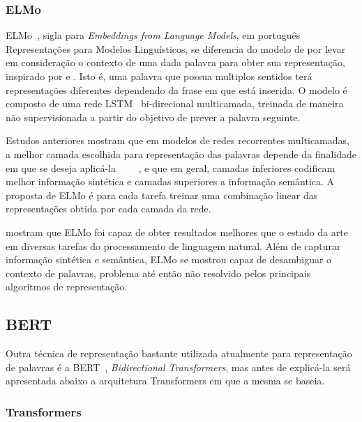 \subsubsection{ELMo}

ELMo~\cite{peters18}, sigla para \textit{Embeddings from Language Models}, em
português Representações para Modelos Linguísticos, se diferencia do modelo de
\citet{cho14} por levar em consideração o contexto de uma dada palavra para
obter sua representação, inspirado por \citet{peters17} e \citet{mccann17}.
Isto é, uma palavra que possua multiplos sentidos terá representações diferentes
dependendo da frase em que está inserida.
O modelo é composto de uma rede LSTM~\cite{hochreiter97} bi-direcional
multicamada, treinada de maneira não supervisionada a partir do objetivo de
prever a palavra seguinte.

Estudos anteriores mostram que em modelos de redes recorrentes multicamadas,
a melhor camada escolhida para representação das palavras depende da finalidade
em que se deseja aplicá-la
~\cite{hashimoto16}~\cite{sogaard16}~\cite{belinkov17}~\cite{melamud16}, e que
em geral, camadas inferiores codificam melhor informação sintética e camadas
superiores a informação semântica.
A proposta de ELMo é para cada tarefa treinar uma combinação linear das
representações obtida por cada camada da rede.


\citet{peters18} mostram que ELMo foi capaz de obter resultados melhores que o
estado da arte em diversas tarefas do processamento de linguagem natural.
Além de capturar informação sintética e semântica, ELMo se mostrou capaz de
desambiguar o contexto de palavras, problema até então não resolvido pelos
principais algoritmos de representação.

\subsection{BERT}

Outra técnica de representação bastante utilizada atualmente para representação
de palavras é a BERT~\cite{devlin18}, \textit{Bidirectional Transformers}, mas
antes de explicá-la será apresentada abaixo a arquitetura Transformers em que a
mesma se baseia.

\subsubsection{Transformers}

